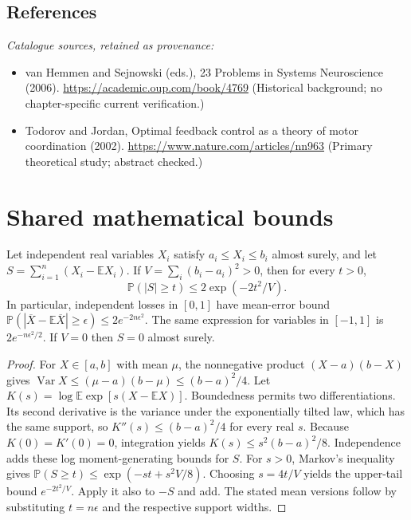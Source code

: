 \documentclass[11pt]{article}
\begin{document}
\subsection{References}
\noindent\emph{Catalogue sources, retained as provenance:}
\begin{itemize}
\item van Hemmen and Sejnowski (eds.), 23 Problems in Systems Neuroscience (2006). \url{https://academic.oup.com/book/4769} (Historical background; no chapter-specific current verification.)
\item Todorov and Jordan, Optimal feedback control as a theory of motor coordination (2002). \url{https://www.nature.com/articles/nn963} (Primary theoretical study; abstract checked.)
\end{itemize}




\section{Shared mathematical bounds}\label{app:bounds}
\begin{lemma}\label{lem:bounded}
Let independent real variables $X_i$ satisfy $a_i\leq X_i\leq b_i$ almost surely,
and let $S=\sum_{i=1}^n(X_i-\mathbb{E} X_i)$. If
$V=\sum_i(b_i-a_i)^2>0$, then for every $t>0$,
\[
 \mathbb{P}(|S|\geq t)\leq 2\exp(-2t^2/V).
\]
In particular, independent losses in $[0,1]$ have mean-error bound
$\mathbb{P}(|\overline X-\mathbb{E}\overline X|\geq\epsilon)
\leq2e^{-2n\epsilon^2}$. The same expression for variables in $[-1,1]$
is $2e^{-n\epsilon^2/2}$. If $V=0$ then $S=0$ almost surely.
\end{lemma}
\begin{proof}
For $X\in[a,b]$ with mean $\mu$, the nonnegative product
$(X-a)(b-X)$ gives
$\operatorname{Var} X\leq(\mu-a)(b-\mu)\leq(b-a)^2/4$.
Let $K(s)=\log\mathbb{E}\exp[s(X-\mathbb{E} X)]$.
Boundedness permits two differentiations. Its second derivative is the variance
under the exponentially tilted law, which has the same support, so
$K''(s)\leq(b-a)^2/4$ for every real $s$.
Because $K(0)=K'(0)=0$, integration yields
$K(s)\leq s^2(b-a)^2/8$.
Independence adds these log moment-generating bounds for $S$.
For $s>0$, Markov's inequality gives
$\mathbb{P}(S\geq t)\leq\exp(-st+s^2V/8)$.
Choosing $s=4t/V$ yields the upper-tail bound $e^{-2t^2/V}$.
Apply it also to $-S$ and add. The stated mean versions follow by substituting
$t=n\epsilon$ and the respective support widths.
\end{proof}
\end{document}
